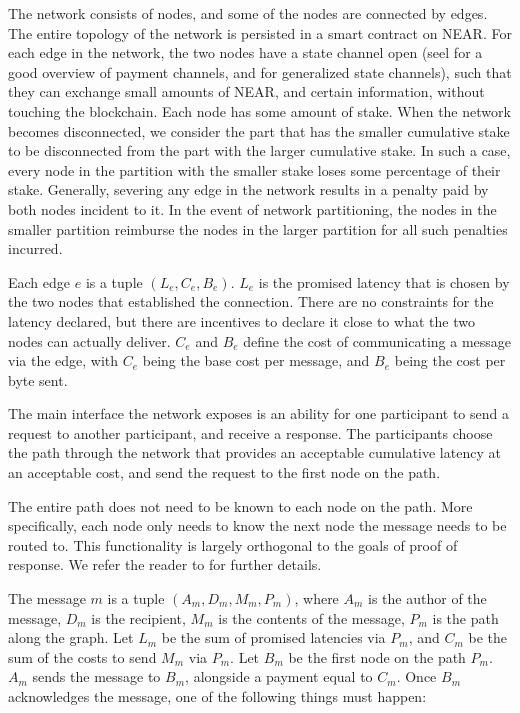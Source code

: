 \documentclass{article}
\begin{document}
The network consists of nodes, and some of the nodes are connected by edges. The entire topology of the network is persisted in a smart contract on NEAR. For each edge in the network, the two nodes have a state channel open (seel \cite{lightning-network} for a good overview of payment channels, and \cite{10.1145/3243734.3243856} for generalized state channels), such that they can exchange small amounts of NEAR, and certain information, without touching the blockchain. Each node has some amount of stake. When the network becomes disconnected, we consider the part that has the smaller cumulative stake to be disconnected from the part with the larger cumulative stake. In such a case, every node in the partition with the smaller stake loses some percentage of their stake. Generally, severing any edge in the network results in a penalty paid by both nodes incident to it. In the event of network partitioning, the nodes in the smaller partition reimburse the nodes in the larger partition for all such penalties incurred.

Each edge \( e \) is a tuple \( \left( L_e, C_e, B_e \right) \). \( L_e \) is the promised latency that is chosen by the two nodes that established the connection. There are no constraints for the latency declared, but there are incentives to declare it close to what the two nodes can actually deliver. \( C_e \) and \( B_e \) define the cost of communicating a message via the edge, with \( C_e \) being the base cost per message, and \( B_e \) being the cost per byte sent.

The main interface the network exposes is an ability for one participant to send a request to another participant, and receive a response. The participants choose the path through the network that provides an acceptable cumulative latency at an acceptable cost, and send the request to the first node on the path.

The entire path does not need to be known to each node on the path. More specifically, each node only needs to know the next node the message needs to be routed to. This functionality is largely orthogonal to the goals of proof of response. We refer the reader to \cite{tor-design} for further details.

The message \( m \) is a tuple \( \left( A_m, D_m, M_m, P_m \right) \), where \( A_m \) is the author of the message, \( D_m \) is the recipient, \( M_m \) is the contents of the message, \( P_m \) is the path along the graph. Let \( L_m \) be the sum of promised latencies via \( P_m \), and \( C_m \) be the sum of the costs to send \( M_m \) via \( P_m \). Let \( B_m \) be the first node on the path \( P_m \). \( A_m \) sends the message to \( B_m \), alongside a payment equal to \( C_m \). Once \( B_m \) acknowledges the message, one of the following things must happen:
\end{document}
